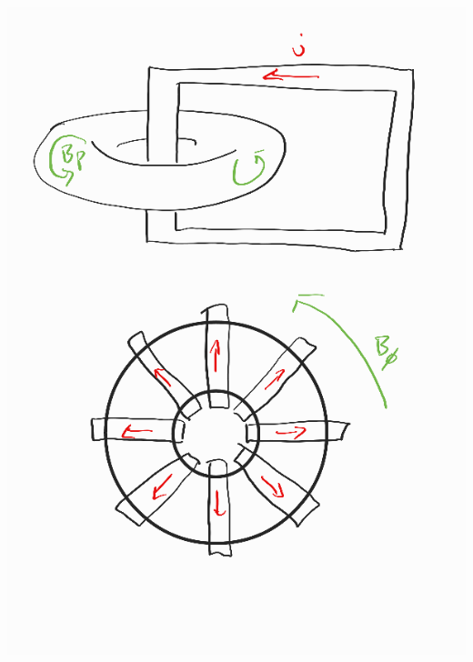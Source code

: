 \documentclass{beamer}
\begin{document}
\begin{frame}
\begin{columns}[T]
    \begin{column}{.5\textwidth}
        \includegraphics[scale=0.28]{imgs/solenoids.png}
    \end{column}

\end{columns}

\end{frame}
\end{document}
